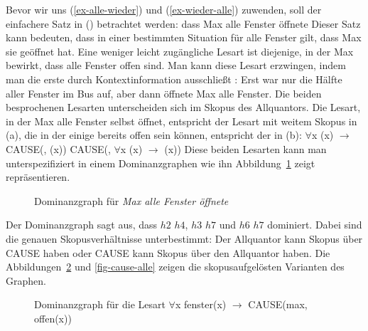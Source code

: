 Bevor wir uns (\ref{ex-alle-wieder}) und (\ref{ex-wieder-alle}) zuwenden, soll der einfachere Satz in () betrachtet werden:
\ea
dass Max alle Fenster öffnete
\z
Dieser Satz kann bedeuten, dass in einer bestimmten Situation für alle Fenster gilt, dass Max sie
geöffnet hat. Eine weniger leicht zugängliche Lesart ist diejenige, in der Max bewirkt, dass alle
Fenster offen sind. Man kann diese Lesart erzwingen, indem man die erste durch Kontextinformation
ausschließt \citep[]{Egg99a}:
\ea
Erst war nur die Hälfte aller Fenster im Bus auf, aber dann öffnete Max alle Fenster.
\z
Die beiden besprochenen Lesarten unterscheiden sich im Skopus des Allquantors. Die Lesart, in der
Max alle Fenster selbst öffnet, entspricht der Lesart mit weitem Skopus in
(a), die in der einige bereits offen sein können, entspricht der in (b):
\eal
\ex $\forall$x (x) $\to$ CAUSE(, (x))
\ex CAUSE(, $\forall$x (x) $\to$ (x))
\zl
Diese beiden Lesarten kann man unterspezifiziert in einem Dominanzgraphen wie ihn Abbildung~\ref{Abbildung-Max-alle-Fenster-oeffnete}
zeigt repräsentieren.
\begin{figure}
\caption{Dominanzgraph für \emph{Max alle Fenster öffnete}\label{Abbildung-Max-alle-Fenster-oeffnete}}
\end{figure}
Der Dominanzgraph sagt aus, dass $h2$ $h4$, $h3$ $h7$ und $h6$ $h7$ dominiert. Dabei sind die genauen Skopusverhältnisse unterbestimmt: Der
Allquantor kann Skopus über CAUSE haben oder CAUSE kann Skopus über den Allquantor haben. Die
Abbildungen~\ref{fig-alle-cause} und \ref{fig-cause-alle} zeigen die skopusaufgelösten Varianten des
Graphen.
\begin{figure}
\caption{Dominanzgraph für die Lesart $\forall$x fenster(x) $\to$ CAUSE(max, offen(x))\label{fig-alle-cause}}
\end{figure}
